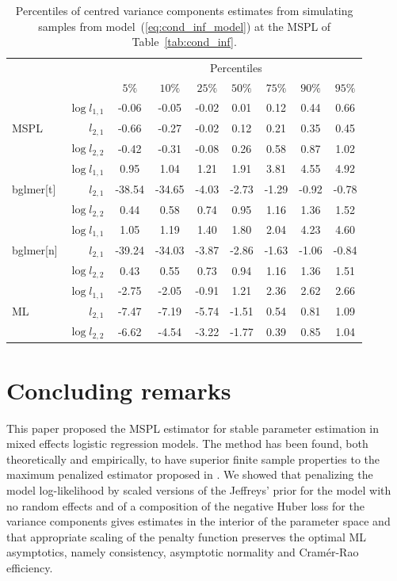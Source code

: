\documentclass[11pt, a4paper]{article}
\theoremstyle{example} \newtheorem{example}{Example}[section]
\theoremstyle{theorem} \newtheorem{theorem}{Theorem}[section]
\begin{document}
\begin{table}[H]
  \centering
  \caption{Percentiles of centred variance components estimates from simulating samples from model~(\ref{eq:cond_inf_model}) at the MSPL of Table~\ref{tab:cond_inf}.} 
  \label{tab:sim2}
  \begin{tabular}{lrccccccc}
	 \toprule 
	&& \multicolumn{7}{c}{Percentiles} \\ \cmidrule{3-9} 
	&&$5\%$&$10\%$&$25\%$&$50\%$&$75\%$&$90\%$&$95\%$\\ \cmidrule{3-9} 
	\cmidrule{3-9} 
	& $\log l_{1,1}$ & -0.06 & -0.05 & -0.02 & 0.01 & 0.12 & 0.44 & 0.66 \\ 
	MSPL & $l_{2,1}$ & -0.66 & -0.27 & -0.02 & 0.12 & 0.21 & 0.35 & 0.45 \\ 
	& $\log l_{2,2}$ & -0.42 & -0.31 & -0.08 & 0.26 & 0.58 & 0.87 & 1.02 \\ 
	\cmidrule{3-9} 
	& $\log l_{1,1}$ & 0.95 & 1.04 & 1.21 & 1.91 & 3.81 & 4.55 & 4.92 \\ 
	bglmer[t] & $l_{2,1}$ & -38.54 & -34.65 & -4.03 & -2.73 & -1.29 & -0.92 & -0.78 \\ 
	& $\log l_{2,2}$ & 0.44 & 0.58 & 0.74 & 0.95 & 1.16 & 1.36 & 1.52 \\ 
	\cmidrule{3-9} 
	& $\log l_{1,1}$ & 1.05 & 1.19 & 1.40 & 1.80 & 2.04 & 4.23 & 4.60 \\ 
	bglmer[n] & $l_{2,1}$ & -39.24 & -34.03 & -3.87 & -2.86 & -1.63 & -1.06 & -0.84 \\ 
	& $\log l_{2,2}$ & 0.43 & 0.55 & 0.73 & 0.94 & 1.16 & 1.36 & 1.51 \\ 
	\cmidrule{3-9} 
	& $\log l_{1,1}$ & -2.75 & -2.05 & -0.91 & 1.21 & 2.36 & 2.62 & 2.66 \\ 
	ML & $l_{2,1}$ & -7.47 & -7.19 & -5.74 & -1.51 & 0.54 & 0.81 & 1.09 \\ 
	& $\log l_{2,2}$ & -6.62 & -4.54 & -3.22 & -1.77 & 0.39 & 0.85 & 1.04 \\ 
	\bottomrule 
  	\bottomrule 
  \end{tabular}
\end{table}

\section{Concluding remarks}
\label{sec:sum}
This paper proposed the MSPL estimator for stable parameter estimation
in mixed effects logistic regression models. The method has been
found, both theoretically and empirically, to have superior finite
sample properties to the maximum penalized estimator proposed in
\citet{chung+etal:2013}. We showed that penalizing the model
log-likelihood by scaled versions of the Jeffreys' prior for the model
with no random effects and of a composition of the negative Huber loss
for the variance components gives estimates in the interior of the
parameter space and that appropriate scaling of the penalty function
preserves the optimal ML asymptotics, namely consistency, asymptotic
normality and Cram\'{e}r-Rao efficiency.
\end{document}

